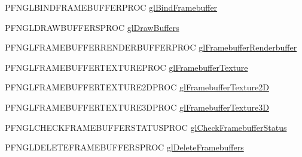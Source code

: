 \begin{DoxyCompactItemize}
\item 
P\+F\+N\+G\+L\+B\+I\+N\+D\+F\+R\+A\+M\+E\+B\+U\+F\+F\+E\+R\+P\+R\+O\+C \hyperlink{class_agmd_1_1_g_l_context_aaf001368b8c3cc26781b8e846e37b62d}{gl\+Bind\+Framebuffer}
\item 
P\+F\+N\+G\+L\+D\+R\+A\+W\+B\+U\+F\+F\+E\+R\+S\+P\+R\+O\+C \hyperlink{class_agmd_1_1_g_l_context_a13e690e9473846871bb098f99e9e35b4}{gl\+Draw\+Buffers}
\item 
P\+F\+N\+G\+L\+F\+R\+A\+M\+E\+B\+U\+F\+F\+E\+R\+R\+E\+N\+D\+E\+R\+B\+U\+F\+F\+E\+R\+P\+R\+O\+C \hyperlink{class_agmd_1_1_g_l_context_a96dcb050d2d9d3f4018214534e58afaa}{gl\+Framebuffer\+Renderbuffer}
\item 
P\+F\+N\+G\+L\+F\+R\+A\+M\+E\+B\+U\+F\+F\+E\+R\+T\+E\+X\+T\+U\+R\+E\+P\+R\+O\+C \hyperlink{class_agmd_1_1_g_l_context_a5bcd8fb85d90af3232858d9b0eef3e90}{gl\+Framebuffer\+Texture}
\item 
P\+F\+N\+G\+L\+F\+R\+A\+M\+E\+B\+U\+F\+F\+E\+R\+T\+E\+X\+T\+U\+R\+E2\+D\+P\+R\+O\+C \hyperlink{class_agmd_1_1_g_l_context_a0c0f82cfc3b3b3330dbece4ee8efcdee}{gl\+Framebuffer\+Texture2\+D}
\item 
P\+F\+N\+G\+L\+F\+R\+A\+M\+E\+B\+U\+F\+F\+E\+R\+T\+E\+X\+T\+U\+R\+E3\+D\+P\+R\+O\+C \hyperlink{class_agmd_1_1_g_l_context_a91f8bb7cc90ad73153fcac596bca08d1}{gl\+Framebuffer\+Texture3\+D}
\item 
P\+F\+N\+G\+L\+C\+H\+E\+C\+K\+F\+R\+A\+M\+E\+B\+U\+F\+F\+E\+R\+S\+T\+A\+T\+U\+S\+P\+R\+O\+C \hyperlink{class_agmd_1_1_g_l_context_a9dd276473366b4eda521bb42e56b8eca}{gl\+Check\+Framebuffer\+Status}
\item 
P\+F\+N\+G\+L\+D\+E\+L\+E\+T\+E\+F\+R\+A\+M\+E\+B\+U\+F\+F\+E\+R\+S\+P\+R\+O\+C \hyperlink{class_agmd_1_1_g_l_context_a06afca9852d2be8f0b580ad8fb3eaae9}{gl\+Delete\+Framebuffers}
\end{DoxyCompactItemize}


